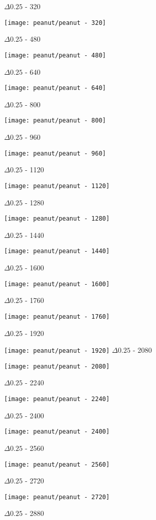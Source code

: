 \begin{enumerate}
\begin{multicols}{4}
\begin{center}
    $\Delta 0.25$ - 320

    \texttt{[image: peanut/peanut - 320]}

    $\Delta 0.25$ - 480

    \texttt{[image: peanut/peanut - 480]}

    $\Delta 0.25$ - 640

    \texttt{[image: peanut/peanut - 640]}

    $\Delta 0.25$ - 800

    \texttt{[image: peanut/peanut - 800]}

    $\Delta 0.25$ - 960

    \texttt{[image: peanut/peanut - 960]}

    $\Delta 0.25$ - 1120

    \texttt{[image: peanut/peanut - 1120]}

    $\Delta 0.25$ - 1280

    \texttt{[image: peanut/peanut - 1280]}

    $\Delta 0.25$ - 1440

    \texttt{[image: peanut/peanut - 1440]}

    $\Delta 0.25$ - 1600

    \texttt{[image: peanut/peanut - 1600]}

    $\Delta 0.25$ - 1760

    \texttt{[image: peanut/peanut - 1760]}

    $\Delta 0.25$ - 1920

    \texttt{[image: peanut/peanut - 1920]}
    \newpage
    $\Delta 0.25$ - 2080

    \texttt{[image: peanut/peanut - 2080]}

    $\Delta 0.25$ - 2240

    \texttt{[image: peanut/peanut - 2240]}

    $\Delta 0.25$ - 2400

    \texttt{[image: peanut/peanut - 2400]}

    $\Delta 0.25$ - 2560

    \texttt{[image: peanut/peanut - 2560]}

    $\Delta 0.25$ - 2720

    \texttt{[image: peanut/peanut - 2720]}

    $\Delta 0.25$ - 2880


\end{center}
\end{multicols}
\end{enumerate}
